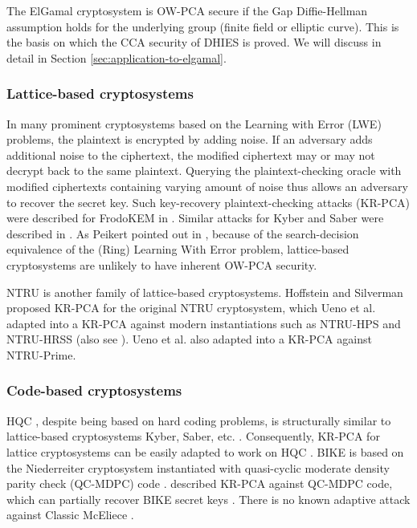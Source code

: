 \documentclass[runningheads]{llncs}
\begin{document}
The ElGamal cryptosystem \cite{DBLP:journals/tit/Elgamal85} is OW-PCA secure if the Gap Diffie-Hellman assumption \cite{DBLP:conf/pkc/OkamotoP01} holds for the underlying group (finite field or elliptic curve). This is the basis on which the CCA security of DHIES \cite{DBLP:conf/ctrsa/AbdallaBR01} is proved. We will discuss in detail in Section \ref{sec:application-to-elgamal}.

\subsubsection{Lattice-based cryptosystems} In many prominent cryptosystems based on the Learning with Error (LWE) problems, the plaintext is encrypted by adding noise. If an adversary adds additional noise to the ciphertext, the modified ciphertext may or may not decrypt back to the same plaintext. Querying the plaintext-checking oracle with modified ciphertexts containing varying amount of noise thus allows an adversary to recover the secret key. Such key-recovery plaintext-checking attacks (KR-PCA) were described for FrodoKEM in \cite{DBLP:conf/crypto/GuoJN20,DBLP:conf/eurocrypt/BaetuDHTV19}. Similar attacks for Kyber and Saber were described in \cite{DBLP:conf/acns/Huguenin-Dumittan20,DBLP:conf/asiacrypt/XagawaIUTH21,DBLP:conf/pqcrypto/GuoM23}. As Peikert pointed out in \cite{cryptoeprint:2014/070}, because of the search-decision equivalence of the (Ring) Learning With Error problem, lattice-based cryptosystems are unlikely to have inherent OW-PCA security. 

NTRU is another family of lattice-based cryptosystems. Hoffstein and Silverman \cite{hoffstein1999reaction} proposed KR-PCA for the original NTRU cryptosystem, which Ueno et al. \cite{DBLP:journals/tches/UenoXTITH22} adapted into a KR-PCA against modern instantiations such as NTRU-HPS and NTRU-HRSS (also see \cite{cryptoeprint:2021/168}). Ueno et al. also adapted \cite{DBLP:conf/crypto/JaulmesJ00} into a KR-PCA against NTRU-Prime.

\subsubsection{Code-based cryptosystems} HQC \cite{hamming-quasi-cyclic-4th-round-submission}, despite being based on hard coding problems, is structurally similar to lattice-based cryptosystems Kyber, Saber, etc. \cite{DBLP:journals/tches/UenoXTITH22}. Consequently, KR-PCA for lattice cryptosystems can be easily adapted to work on HQC \cite{DBLP:conf/acns/Huguenin-Dumittan20,DBLP:conf/eurocrypt/BaetuDHTV19}. BIKE \cite{bike-4th-round-submission} is based on the Niederreiter cryptosystem instantiated with quasi-cyclic moderate density parity check (QC-MDPC) code \cite{DBLP:conf/isit/MisoczkiTSB13}. \cite{DBLP:conf/asiacrypt/Guo0S16} described KR-PCA against QC-MDPC code, which can partially recover BIKE secret keys \cite{DBLP:conf/asiacrypt/XagawaIUTH21}. There is no known adaptive attack against Classic McEliece  \cite{DBLP:journals/tches/UenoXTITH22}.
\end{document}
